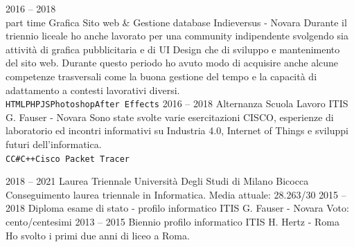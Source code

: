 \documentclass[9pt]{developercv}
\begin{document}
\begin{entrylist}
	\entry
		{2016 -- 2018\\\footnotesize{part time}}
		{Grafica Sito web \& Gestione database}
		{Indieversus - Novara}
		{Durante il triennio liceale ho anche lavorato per una community indipendente svolgendo sia attività di grafica pubblicitaria e di UI Design che di sviluppo e mantenimento del sito web. Durante questo periodo ho avuto modo di acquisire anche alcune competenze trasversali come la buona gestione del tempo e la capacità di adattamento a contesti lavorativi diversi. \\ \texttt{HTML}\slashsep\texttt{PHP}\slashsep\texttt{JS}\slashsep\texttt{Photoshop}\slashsep\texttt{After Effects}}
	\entry
		{2016 -- 2018}
		{Alternanza Scuola Lavoro}
		{ITIS G. Fauser - Novara}
		{Sono state svolte varie esercitazioni CISCO, esperienze di laboratorio ed incontri informativi su Industria 4.0, Internet of Things e sviluppi futuri dell'informatica. \\ \texttt{C}\slashsep\texttt{C\#}\slashsep\texttt{C++}\slashsep\texttt{Cisco Packet Tracer}}
\end{entrylist}



\begin{entrylist}
	\entry
		{2018 -- 2021}
		{Laurea Triennale}
		{Università Degli Studi di Milano Bicocca}
		{Conseguimento laurea triennale in Informatica. Media attuale: 28.263/30}
	\entry
		{2015 -- 2018}
		{Diploma esame di stato - profilo informatico}
		{ITIS G. Fauser - Novara}
		{Voto: cento/centesimi}
	\entry
		{2013 -- 2015}
		{Biennio profilo informatico}
		{ITIS H. Hertz - Roma}
		{Ho svolto i primi due anni di liceo a Roma.}
\end{entrylist}

\end{document}
